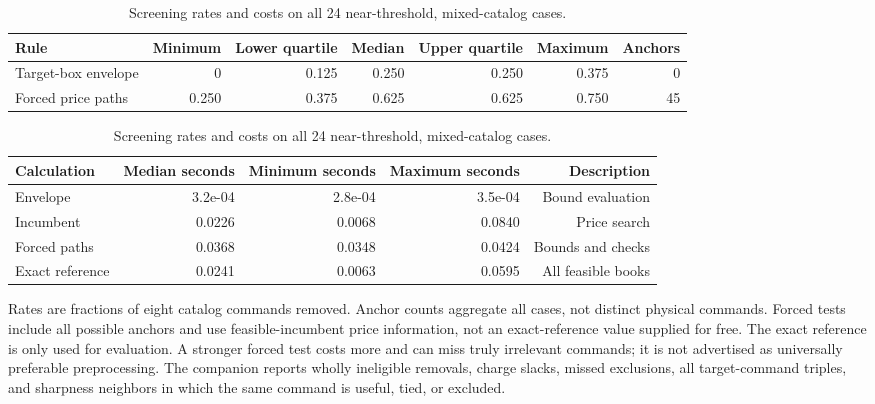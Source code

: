 \begin{table}[p]\centering\small\setlength{\tabcolsep}{3pt}
\caption{Screening rates and costs on all 24 near-threshold, mixed-catalog cases.}\label{tab:screen54}
\begin{tabular}{lrrrrrr}\toprule
Rule & Minimum & Lower quartile & Median & Upper quartile & Maximum & Anchors\\\midrule
Target-box envelope & 0 & 0.125 & 0.250 & 0.250 & 0.375 & 0\\
Forced price paths & 0.250 & 0.375 & 0.625 & 0.625 & 0.750 & 45\\
\bottomrule\end{tabular}\par\medskip
\begin{tabular}{lrrrr}\toprule Calculation & Median seconds & Minimum seconds & Maximum seconds & Description\\\midrule
Envelope & 3.2e-04 & 2.8e-04 & 3.5e-04 & Bound evaluation\\
Incumbent & 0.0226 & 0.0068 & 0.0840 & Price search\\
Forced paths & 0.0368 & 0.0348 & 0.0424 & Bounds and checks\\
Exact reference & 0.0241 & 0.0063 & 0.0595 & All feasible books\\
\bottomrule\end{tabular}
\par\smallskip\begin{minipage}{0.98\textwidth}\small Rates are fractions of eight catalog commands removed. Anchor counts aggregate all cases, not distinct physical commands. Forced tests include all possible anchors and use feasible-incumbent price information, not an exact-reference value supplied for free. The exact reference is only used for evaluation. A stronger forced test costs more and can miss truly irrelevant commands; it is not advertised as universally preferable preprocessing. The companion reports wholly ineligible removals, charge slacks, missed exclusions, all target-command triples, and sharpness neighbors in which the same command is useful, tied, or excluded.\end{minipage}\end{table}\clearpage
